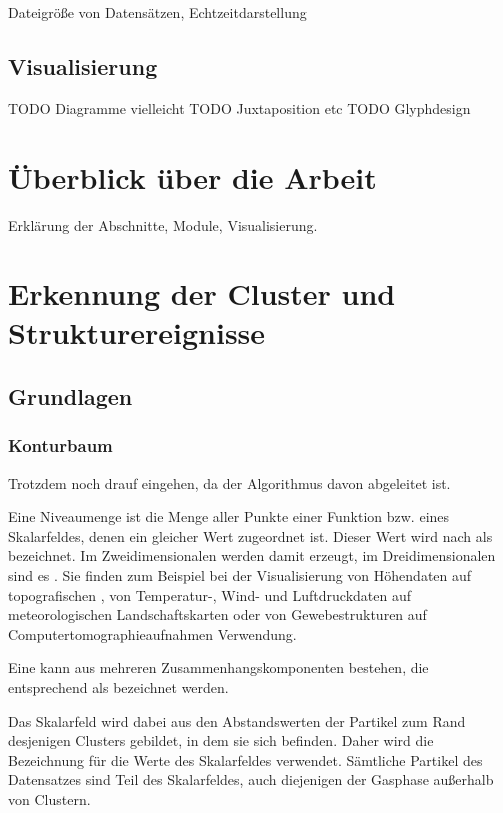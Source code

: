 Dateigröße von Datensätzen, Echtzeitdarstellung

\section{Visualisierung}

TODO Diagramme vielleicht
TODO Juxtaposition etc
TODO Glyphdesign

\chapter{Überblick über die Arbeit}

Erklärung der Abschnitte, Module, Visualisierung.

\chapter{Erkennung der Cluster und Strukturereignisse}

\section{Grundlagen}
\subsection{Konturbaum}\label{sec:grundlagen:konturbaum}
Trotzdem noch drauf eingehen, da der Algorithmus davon abgeleitet ist.

Eine Niveaumenge ist die Menge aller Punkte einer Funktion bzw. eines Skalarfeldes, denen ein gleicher Wert zugeordnet ist. Dieser Wert wird nach \cite[S.~1]{carr2010flexibleIsosurfaces} als  bezeichnet. Im Zweidimensionalen werden damit  erzeugt, im Dreidimensionalen sind es . Sie finden zum Beispiel bei der Visualisierung von Höhendaten auf topografischen \cite{hurni2010landform} \cite{openstreetmapContours}, von Temperatur-, Wind- und Luftdruckdaten auf meteorologischen Landschaftskarten \cite{hopkins1996weather} oder von Gewebestrukturen auf Computertomographieaufnahmen \cite{tang2014ctImages} Verwendung.

Eine  kann aus mehreren Zusammenhangskomponenten bestehen, die entsprechend \cite[S.~2]{carr2001computingCountourTrees} als  bezeichnet werden.

Das Skalarfeld wird dabei aus den Abstandswerten der Partikel zum Rand desjenigen Clusters gebildet, in dem sie sich befinden. Daher wird die Bezeichnung  für die Werte des Skalarfeldes verwendet. Sämtliche Partikel des Datensatzes sind Teil des Skalarfeldes, auch diejenigen der Gasphase außerhalb von Clustern.

